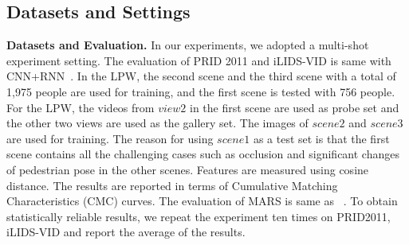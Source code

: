 \documentclass[letterpaper]{article} %
\begin{document}
\subsection{Datasets and Settings}

{\bf Datasets and Evaluation.} In our experiments, we adopted a multi-shot experiment setting. The evaluation of PRID 2011 and iLIDS-VID is same with CNN+RNN~\cite{mclaughlin2016recurrent}. In the LPW, the second scene and the third scene with a total of 1,975 people are used for training, and the first scene is tested with 756 people. For the LPW, the videos from $view2$ in the first scene are used as probe set and the other two views are used as the gallery set. The images of $scene2$ and $scene3$ are used for training. The reason for using $scene1$ as a test set is that the first scene contains all the challenging cases such as occlusion and significant changes of pedestrian pose in the other scenes. Features are measured using cosine distance. The results are reported in terms of Cumulative Matching Characteristics (CMC) curves. The evaluation of MARS is same as ~\cite{zheng2016mars}. To obtain statistically reliable results, we repeat the experiment ten times on PRID2011, iLIDS-VID and report the average of the results.
\end{document}
